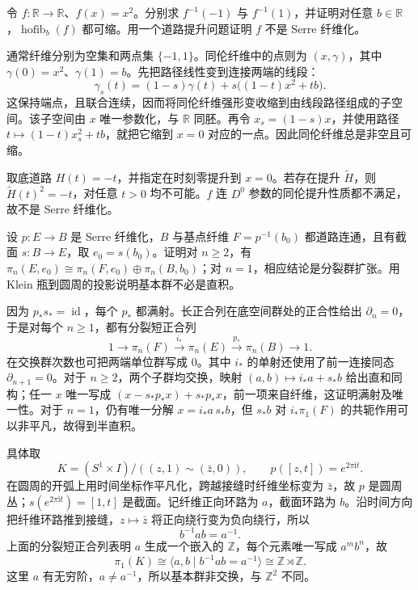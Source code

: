 \begin{exercise}\label{g2:ex:square-map-homotopy-fiber}
	令 \(f:\mathbb R\rightarrow\mathbb R\)、\(f(x)=x^2\)。分别求 \(f^{-1}(-1)\) 与 \(f^{-1}(1)\)，并证明对任意 \(b\in\mathbb R\)，\(\operatorname{hofib}_b(f)\) 都可缩。用一个道路提升问题证明 \(f\) 不是 Serre 纤维化。
\end{exercise}
\begin{solution}
	通常纤维分别为空集和两点集 \(\{-1,1\}\)。同伦纤维中的点则为 \((x,\gamma)\)，其中 \(\gamma(0)=x^2\)、\(\gamma(1)=b\)。先把路径线性变到连接两端的线段：
	\[
		\gamma_s(t)=(1-s)\gamma(t)+s\bigl((1-t)x^2+tb\bigr).
	\]
	这保持端点，且联合连续，因而将同伦纤维强形变收缩到由线段路径组成的子空间。该子空间由 \(x\) 唯一参数化，与 \(\mathbb R\) 同胚。再令 \(x_s=(1-s)x\)，并使用路径 \(t\mapsto(1-t)x_s^2+tb\)，就把它缩到 \(x=0\) 对应的一点。因此同伦纤维总是非空且可缩。

	取底道路 \(H(t)=-t\)，并指定在时刻零提升到 \(x=0\)。若存在提升 \(\widetilde H\)，则 \(\widetilde H(t)^2=-t\)，对任意 \(t>0\) 均不可能。\(f\) 连 \(D^0\) 参数的同伦提升性质都不满足，故不是 Serre 纤维化。
\end{solution}

\begin{exercise}\label{g2:ex:fibration-section-splitting}
	设 \(p:E\to B\) 是 Serre 纤维化，\(B\) 与基点纤维 \(F=p^{-1}(b_0)\) 都道路连通，且有截面 \(s:B\to E\)，取 \(e_0=s(b_0)\)。证明对 \(n\ge2\)，有 \(\pi_n(E,e_0)\cong\pi_n(F,e_0)\oplus\pi_n(B,b_0)\)；对 \(n=1\)，相应结论是分裂群扩张。用 Klein 瓶到圆周的投影说明基本群不必是直积。
\end{exercise}
\begin{solution}
	因为 \(p_*s_*=\operatorname{id}\)，每个 \(p_*\) 都满射。长正合列在底空间群处的正合性给出 \(\partial_n=0\)，于是对每个 \(n\ge1\)，都有分裂短正合列
	\[
		1\longrightarrow\pi_n(F)\xrightarrow{i_*}\pi_n(E)\xrightarrow{p_*}\pi_n(B)\longrightarrow1.
	\]
	在交换群次数也可把两端单位群写成 \(0\)。其中 \(i_*\) 的单射还使用了前一连接同态 \(\partial_{n+1}=0\)。对于 \(n\ge2\)，两个子群均交换，映射 \((a,b)\mapsto i_*a+s_*b\) 给出直和同构；任一 \(x\) 唯一写成 \((x-s_*p_*x)+s_*p_*x\)，前一项来自纤维，这证明满射及唯一性。对于 \(n=1\)，仍有唯一分解 \(x=i_*a\,s_*b\)，但 \(s_*b\) 对 \(i_*\pi_1(F)\) 的共轭作用可以非平凡，故得到半直积。

	具体取
	\[
		K=(S^1\times I)/((z,1)\sim(\bar z,0)),\qquad p([z,t])=e^{2\pi\mathrm i t}.
	\]
	在圆周的开弧上用时间坐标作平凡化，跨越接缝时纤维坐标变为 \(\bar z\)，故 \(p\) 是圆周丛；\(s(e^{2\pi\mathrm i t})=[1,t]\) 是截面。记纤维正向环路为 \(a\)，截面环路为 \(b\)。沿时间方向把纤维环路推到接缝，\(z\mapsto\bar z\) 将正向绕行变为负向绕行，所以
	\[
		b^{-1}ab=a^{-1}.
	\]
	上面的分裂短正合列表明 \(a\) 生成一个嵌入的 \(\mathbb Z\)，每个元素唯一写成 \(a^m b^n\)，故
	\[
		\pi_1(K)\cong\langle a,b\mid b^{-1}ab=a^{-1}\rangle\cong\mathbb Z\rtimes\mathbb Z.
	\]
	这里 \(a\) 有无穷阶，\(a\ne a^{-1}\)，所以基本群非交换，与 \(\mathbb Z^2\) 不同。
\end{solution}


